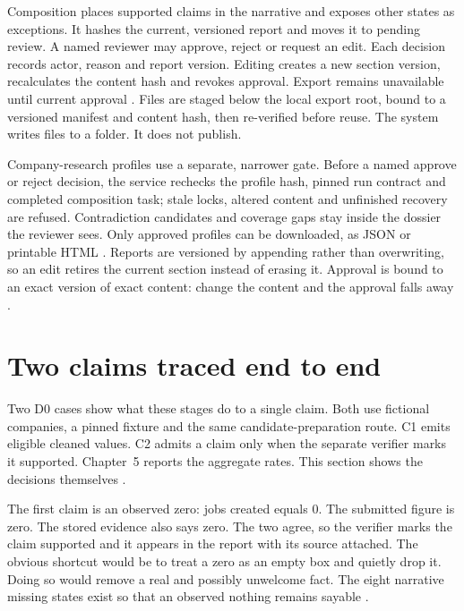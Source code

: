 Composition places supported claims in the narrative and exposes other states as exceptions. It
hashes the current, versioned report and moves it to pending review. A named reviewer may approve,
reject or request an edit. Each decision records actor, reason and report version. Editing creates a
new section version, recalculates the content hash and revokes approval. Export remains unavailable
until current approval \citep{amershi2019guidelines,bucinca2021forcing,pineau2021reproducibility}.
Files are staged below the local export root, bound to a versioned manifest and content hash, then
re-verified before reuse. The system writes files to a folder. It does not publish.

Company-research profiles use a separate, narrower gate. Before a named approve or reject decision,
the service rechecks the profile hash, pinned run contract and completed composition task; stale
locks, altered content and unfinished recovery are refused. Contradiction candidates and coverage
gaps stay inside the dossier the reviewer sees. Only approved profiles can be downloaded, as JSON or
printable HTML \citep{gao2023alce,nist2023airmf}. Reports are versioned by appending rather than
overwriting, so an edit retires the current section instead of erasing it. Approval is bound to an
exact version of exact content: change the content and the approval falls away
\citep{pineau2021reproducibility,amershi2019guidelines}.

\section{Two claims traced end to end}
\label{sec:claim-journey}

Two D0 cases show what these stages do to a single claim. Both use fictional companies, a pinned
fixture and the same candidate-preparation route. C1 emits eligible cleaned values. C2 admits a claim
only when the separate verifier marks it supported. Chapter~5 reports the aggregate rates. This
section shows the decisions themselves \citep{gao2023alce,bradley2024synfintabs}.

The first claim is an observed zero: jobs created equals 0. The submitted figure is zero. The stored
evidence also says zero. The two agree, so the verifier marks the claim supported and it appears in
the report with its source attached. The obvious shortcut would be to treat a zero as an empty box
and quietly drop it. Doing so would remove a real and possibly unwelcome fact. The eight narrative
missing states exist so that an observed nothing remains sayable
\citep{bradley2024synfintabs,gebru2021datasheets}.

